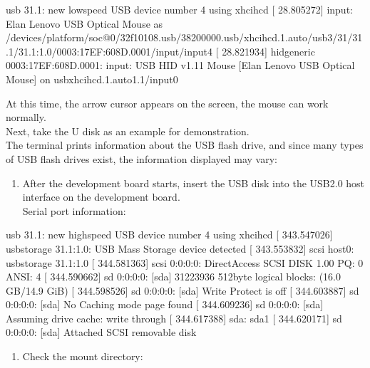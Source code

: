 \documentclass[letterpaper,10pt,openany,english]{sphinxmanual}
\begin{document}
\begin{sphinxVerbatim}[commandchars=\\\{\}]
[   28.641316] usb 3\PYGZhy{}1.1: new low\PYGZhy{}speed USB device number 4 using xhci\PYGZhy{}hcd
[   28.805272] input: Elan Lenovo USB Optical Mouse as /devices/platform/soc@0/32f10108.usb/38200000.usb/xhci\PYGZhy{}hcd.1.auto/usb3/3\PYGZhy{}1/3\PYGZhy{}1.1/3\PYGZhy{}1.1:1.0/0003:17EF:608D.0001/input/input4
[   28.821934] hid\PYGZhy{}generic 0003:17EF:608D.0001: input: USB HID v1.11 Mouse [Elan Lenovo USB Optical Mouse] on usb\PYGZhy{}xhci\PYGZhy{}hcd.1.auto\PYGZhy{}1.1/input0
\end{sphinxVerbatim}

\sphinxAtStartPar
At this time, the arrow cursor appears on the screen, the mouse can work normally.\\
Next, take the U disk as an example for demonstration.\\
The terminal prints information about the USB flash drive, and since many types of USB flash drives exist, the information displayed may vary:
\begin{enumerate}
%
\item {} 
\sphinxAtStartPar
After the development board starts, insert the USB disk into the USB2.0 host interface on the development board.\\
Serial port information:

\end{enumerate}

\begin{sphinxVerbatim}[commandchars=\\\{\}]
[  343.438673] usb 3\PYGZhy{}1.1: new high\PYGZhy{}speed USB device number 4 using xhci\PYGZhy{}hcd
[  343.547026] usb\PYGZhy{}storage 3\PYGZhy{}1.1:1.0: USB Mass Storage device detected
[  343.553832] scsi host0: usb\PYGZhy{}storage 3\PYGZhy{}1.1:1.0
[  344.581363] scsi 0:0:0:0: Direct\PYGZhy{}Access     SCSI     DISK             1.00 PQ: 0 ANSI: 4
[  344.590662] sd 0:0:0:0: [sda] 31223936 512\PYGZhy{}byte logical blocks: (16.0 GB/14.9 GiB)
[  344.598526] sd 0:0:0:0: [sda] Write Protect is off
[  344.603887] sd 0:0:0:0: [sda] No Caching mode page found
[  344.609236] sd 0:0:0:0: [sda] Assuming drive cache: write through
[  344.617388]  sda: sda1
[  344.620171] sd 0:0:0:0: [sda] Attached SCSI removable disk
\end{sphinxVerbatim}
\begin{enumerate}
%
\setcounter{enumi}{1}
\item {} 
\sphinxAtStartPar
Check the mount directory:

\end{enumerate}
\end{document}
